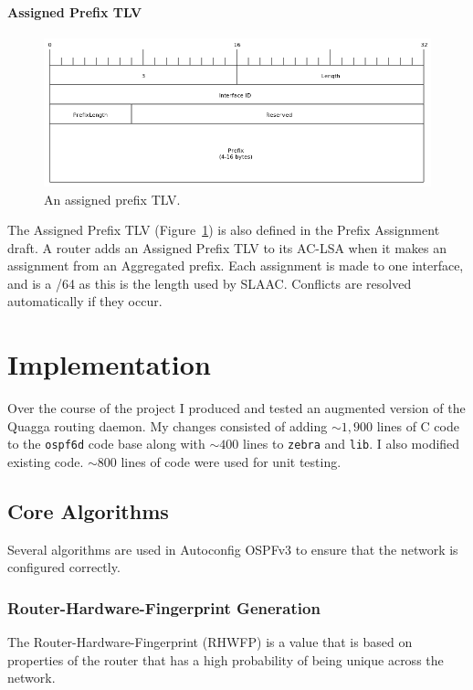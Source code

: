 \documentclass[12pt,a4paper,twoside]{report}
\newcommand*{\mysym}{\mathord{\sim}}
\begin{document}
\subsubsection{Assigned Prefix TLV}
\begin{figure}
\begin{center}
	\includegraphics[width=\linewidth]{../Diagrams/Packets/assigned_prefix_tlv.png}
	\caption{An assigned prefix TLV.}\label{fig:AssignedPrefix-TLV}
\end{center}
\end{figure}
The Assigned Prefix TLV (Figure~\ref{fig:AssignedPrefix-TLV}) is also defined
in the Prefix Assignment draft. A router adds an Assigned Prefix TLV to its
AC-LSA when it makes an assignment from an Aggregated prefix. Each assignment
is made to one interface, and is a /64 as this is the length used by SLAAC\@.
Conflicts are resolved automatically if they occur. 

\chapter{Implementation}
Over the course of the project I produced and tested an augmented version of
the Quagga routing daemon. My changes consisted of adding $\mysym1,900$ lines
of C code to the \texttt{ospf6d} code base along with $\mysym400$ lines to
\texttt{zebra} and \texttt{lib}. I also modified existing code. $\mysym800$
lines of code were used for unit testing.

\section{Core Algorithms}
Several algorithms are used in Autoconfig OSPFv3 to ensure that the network
is configured correctly.

\subsection{Router-Hardware-Fingerprint Generation}
The Router-Hardware-Fingerprint (RHWFP) is a value that is based on properties of
the router that has a high probability of being unique across the network. 
\end{document}
